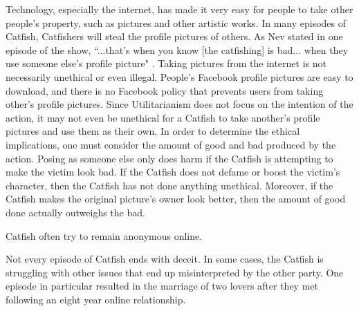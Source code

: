 \documentclass{paper}
\begin{document}
\begin{linenumbers}
Technology, especially the internet, has made it very easy for people to take other people's property, such as pictures and other artistic works. In many episodes of Catfish, Catfishers will steal the profile pictures of others. As Nev stated in one episode of the show, ``...that's when you know [the catfishing] is bad... when they use someone else's profile picture" \cite{ctfs}. Taking pictures from the internet is not necessarily unethical or even illegal. People's Facebook profile pictures are easy to download, and there is no Facebook policy that prevents users from taking other's profile pictures. Since Utilitarianism does not focus on the intention of the action, it may not even be unethical for a Catfish to take another's profile pictures and use them as their own. In order to determine the ethical implications, one must consider the amount of good and bad produced by the action. Posing as someone else only does harm if the Catfish is attempting to make the victim look bad. If the Catfish does not defame or boost the victim's character, then the Catfish has not done anything unethical. Moreover, if the Catfish makes the original picture's owner look better, then the amount of good done actually outweighs the bad.

Catfish often try to remain anonymous online.

Not every episode of Catfish ends with deceit. In some cases, the Catfish is struggling with other issues that end up misinterpreted by the other party. One episode in particular resulted in the marriage of two lovers after they met following an eight year online relationship.

\end{linenumbers}
\newpage

\printbibliography
\end{document}
